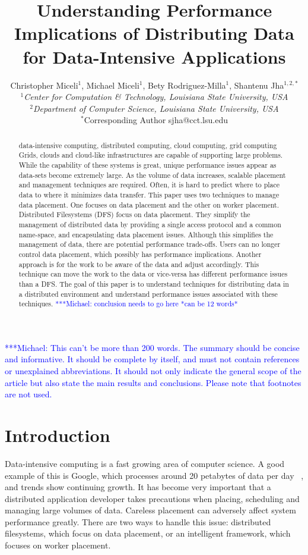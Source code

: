 \documentclass{rspublic}
\title[Understanding Performance Implications of Distributing Data for
Data-Intensive Applications]{Understanding Performance Implications of
Distributing Data for Data-Intensive Applications}
\author[Miceli, Miceli, Rodriguez-Milla, Jha]{ Christopher Miceli$^{1}$,
Michael Miceli$^{1}$, Bety Rodriguez-Milla$^{1}$, Shantenu Jha$^{1,2,*}$ \\
\small{\emph{$^{1}$Center for Computation \& Technology, Louisiana State
University, USA}} \\  \small{\emph{$^{2}$Department of Computer Science,
Louisiana State University, USA}} \\ {\footnotesize {\hspace{0.0 in}
$^*$Corresponding Author sjha@cct.lsu.edu}} }
\newcommand{\micnote}[1]{ {\textcolor{blue} { ***Michael: #1 }}} \else
\begin{document}
 \maketitle

\micnote{This can't be more than 200 words.  The summary should be concise and
informative.  It should be complete by itself, and must not contain references
or unexplained abbreviations.  It should not only indicate the general scope of
the article but also state the main results and conclusions.  Please note that
footnotes are not used.}

\begin{abstract}{data-intensive computing, distributed computing, cloud
computing, grid computing} Grids, clouds and cloud-like infrastructures are
capable of supporting large problems.  While the capability of these systems is
great, unique performance issues appear as data-sets become extremely large.
As the volume of data increases, scalable placement and management techniques
are required.  Often, it is hard to predict where to place data to where it
minimizes data transfer.  This paper uses two techniques to manage data
placement.  One focuses on data placement and the other on worker placement.
Distributed Filesystems (DFS) focus on data placement.  They simplify the
management of distributed data by providing a single access protocol and a
common name-space, and encapsulating data placement issues.  Although this
simplifies the management of data, there are potential performance trade-offs.
Users can no longer control data placement, which possibly has performance
implications.  Another approach is for the work to be aware of the data and
adjust accordingly. This technique can move the work to the data or vice-versa
has different performance issues than a DFS.  The goal of this paper is to
understand techniques for distributing data in a distributed environment and
understand performance issues associated with these
techniques.\micnote{conclusion needs to go here *can be 12
words*}\end{abstract}

\section{Introduction} Data-intensive computing is a fast growing area of
computer science.  A good example of this is Google, which processes around 20
petabytes of data per day ~\citep{google}, and trends show continuing growth.
It has become very important that a distributed application developer takes
precautions when placing, scheduling and managing large volumes of data.
Careless placement can adversely affect system performance greatly.  There are
two ways to handle this issue: distributed filesystems, which focus on data
placement, or an intelligent framework, which focuses on worker placement.
\end{document}
